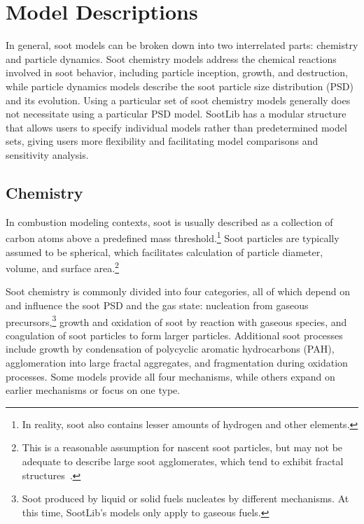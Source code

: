 \documentclass[preprint,letterpaper]{elsarticle}
\begin{document}

\section{Model Descriptions}
\label{s:models}

In general, soot models can be broken down into two interrelated parts: chemistry and particle dynamics.
Soot chemistry models address the chemical reactions involved in soot behavior, including particle inception, growth, and destruction, while particle dynamics models describe the soot particle size distribution (PSD) and its evolution.
Using a particular set of soot chemistry models generally does not necessitate using a particular PSD model.
SootLib has a modular structure that allows users to specify individual models rather than predetermined model sets, giving users more flexibility and facilitating model comparisons and sensitivity analysis.


\subsection{Chemistry}
\label{s:chemistry}

In combustion modeling contexts, soot is usually described as a collection of carbon atoms above a predefined mass threshold.\footnote{In reality, soot also contains lesser amounts of hydrogen and other elements.} Soot particles are typically assumed to be spherical, which facilitates calculation of particle diameter, volume, and surface area.\footnote{This is a reasonable assumption for nascent soot particles, but may not be adequate to describe large soot agglomerates, which tend to exhibit fractal structures~\cite{Jullien_1987,Wang_2011}.}

Soot chemistry is commonly divided into four categories, all of which depend on and influence the soot PSD and the gas state: nucleation from gaseous precursors,\footnote{Soot produced by liquid or solid fuels nucleates by different mechanisms. At this time, SootLib's models only apply to gaseous fuels.} growth and oxidation of soot by reaction with gaseous species, and coagulation of soot particles to form larger particles.
Additional soot processes include growth by condensation of polycyclic aromatic hydrocarbons (PAH), agglomeration into large fractal aggregates, and fragmentation during oxidation processes.
Some models provide all four mechanisms, while others expand on earlier mechanisms or focus on one type.
\end{document}
